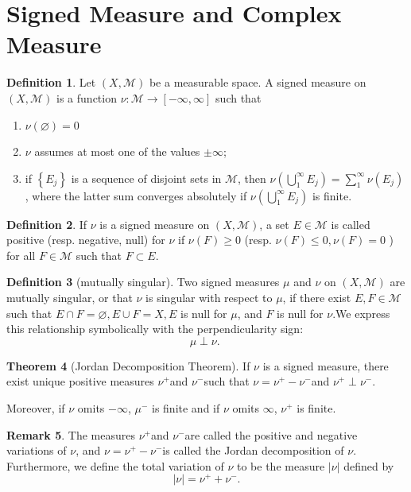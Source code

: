 \documentclass[12pt,a4paper]{book}
\newenvironment{enu}{\begin{enumerate}[(1)]}{\end{enumerate}}
\theoremstyle{definition}
\newtheorem{defn}{Definition}[section]
\newtheorem{theo}[defn]{Theorem}
\newtheorem{rema}[defn]{Remark}
\begin{document}
\section{Signed Measure and Complex Measure}
\begin{defn}
    Let $(X, \mathcal{M})$ be a measurable space. A signed measure on $(X, \mathcal{M})$ is a function $\nu: \mathcal{M} \rightarrow[-\infty, \infty]$ such that
    \begin{enu}
        \item $\nu(\varnothing)=0$
        \item $\nu$ assumes at most one of the values $\pm \infty$;
        \item if $\left\{E_j\right\}$ is a sequence of disjoint sets in $\mathcal{M}$, then $\nu\left(\bigcup_1^{\infty} E_j\right)=\sum_1^{\infty} \nu\left(E_j\right)$, where the latter sum converges absolutely if $\nu\left(\bigcup_1^{\infty} E_j\right)$ is finite.
    \end{enu}
\end{defn}
\begin{defn}
    If $\nu$ is a signed measure on $(X, \mathcal{M})$, a set $E \in \mathcal{M}$ is called positive (resp. negative, null) for $\nu$ if $\nu(F) \geq 0$ (resp. $\nu(F) \leq 0, \nu(F)=0$ ) for all $F \in \mathcal{M}$ such that $F \subset E$.
\end{defn}
\begin{defn}[mutually singular]
    Two signed measures $\mu$ and $\nu$ on $(X, \mathcal{M})$ are mutually singular, or that $\nu$ is singular with respect to $\mu$, if there exist $E, F \in \mathcal{M}$ such that $E \cap F=\varnothing, E \cup F=X, E$ is null for $\mu$, and $F$ is null for $\nu$.We express this relationship symbolically with the perpendicularity sign:
    $$
        \mu \perp \nu \text {. }
    $$
\end{defn}
\begin{theo}[Jordan Decomposition Theorem]
    If $\nu$ is a signed measure, there exist unique positive measures $\nu^{+}$and $\nu^{-}$such that $\nu=\nu^{+}-\nu^{-}$and $\nu^{+} \perp \nu^{-}$.

    Moreover, if $\nu$ omits $-\infty$, $\mu^{-}$ is finite and if $\nu$ omits $\infty$, $\nu^{+}$ is finite.
\end{theo}
\begin{rema}
    The measures $\nu^{+}$and $\nu^{-}$are called the positive and negative variations of $\nu$, and $\nu=\nu^{+}-\nu^{-}$is called the Jordan decomposition of $\nu$. Furthermore, we define the total variation of $\nu$ to be the measure $|\nu|$ defined by
    $$
        |\nu|=\nu^{+}+\nu^{-} .
    $$
\end{rema}
\end{document}
